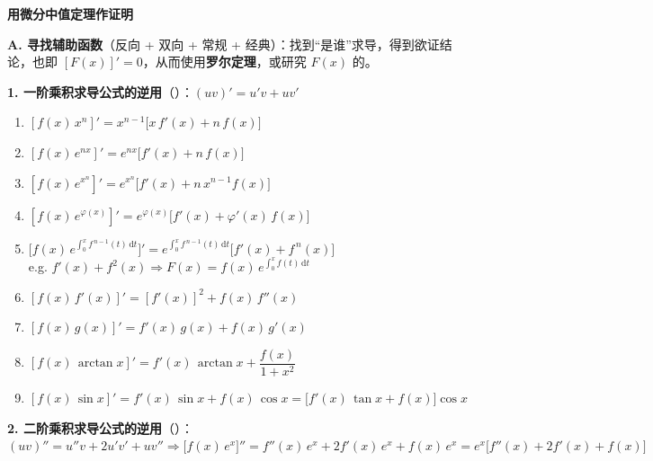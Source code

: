\documentclass[a4paper,12pt]{article}
\begin{document}
    \pagestyle{empty}

    \begin{center}
        {\large\textbf{用微分中值定理作证明}}
    \end{center}

    \vspace{0.5em}

    \begin{minipage}[t]{0.46\textwidth}
        \textbf{A. 寻找辅助函数}（反向 + 双向 + 常规 + 经典）：找到``是谁''求导，得到欲证结论，也即 $[F(x)]' = 0$，从而使用\textbf{罗尔定理}，或研究 $F(x)$ 的{\color{red}{性质}}。

        \vspace{0.8em}

        \textbf{1. 一阶乘积求导公式的逆用}（{\color{red}{经典}}）：$(uv)' = u'v + uv'$
        \begin{enumerate}[label=\alph*., leftmargin=2em, itemsep=0.6em]
            \item $[f(x)\,x^{n}]' = x^{n-1}\bigl[x\,f'(x) + n\,f(x)\bigr]$
            \item $[f(x)\,e^{nx}]' = e^{nx}\bigl[f'(x) + n\,f(x)\bigr]$
            \item $[f(x)\,e^{x^{n}}]' = e^{x^{n}}\bigl[f'(x) + n\,x^{n-1}f(x)\bigr]$
            \item $[f(x)\,e^{\varphi(x)}]' = e^{\varphi(x)}\bigl[f'(x) + \varphi'(x)\,f(x)\bigr]$
            \item $\bigl[f(x)\,e^{\int_{0}^{x} f^{\,n-1}(t)\,\mathrm{d}t}\bigr]' = e^{\int_{0}^{x} f^{\,n-1}(t)\,\mathrm{d}t}\bigl[f'(x) + f^{\,n}(x)\bigr]$\\
                  e.g. $f'(x) + f^{2}(x) \Rightarrow F(x) = f(x)\,e^{\int_{0}^{x} f(t)\,\mathrm{d}t}$
            \item $[f(x)\,f'(x)]' = [f'(x)]^{2} + f(x)\,f''(x)$
            \item $[f(x)\,g(x)]' = f'(x)\,g(x) + f(x)\,g'(x)$
            \item $[f(x)\,\arctan x]' = f'(x)\,\arctan x + \dfrac{f(x)}{1 + x^{2}}$\quad{\color{red}{（记住）}}
            \item $[f(x)\,\sin x]' = f'(x)\,\sin x + f(x)\,\cos x = \bigl[f'(x)\,\tan x + f(x)\bigr]\cos x$
        \end{enumerate}

        \vspace{0.5em}

        \textbf{2. 二阶乘积求导公式的逆用}（{\color{red}{经典}}）{\color{red}{（批注：凹凸性）}}：\\
        $(uv)'' = u''v + 2u'v' + uv'' \Rightarrow \bigl[f(x)\,e^{x}\bigr]'' = f''(x)\,e^{x} + 2f'(x)\,e^{x} + f(x)\,e^{x} = e^{x}\bigl[f''(x) + 2f'(x) + f(x)\bigr]$


\end{minipage}
\end{document}
